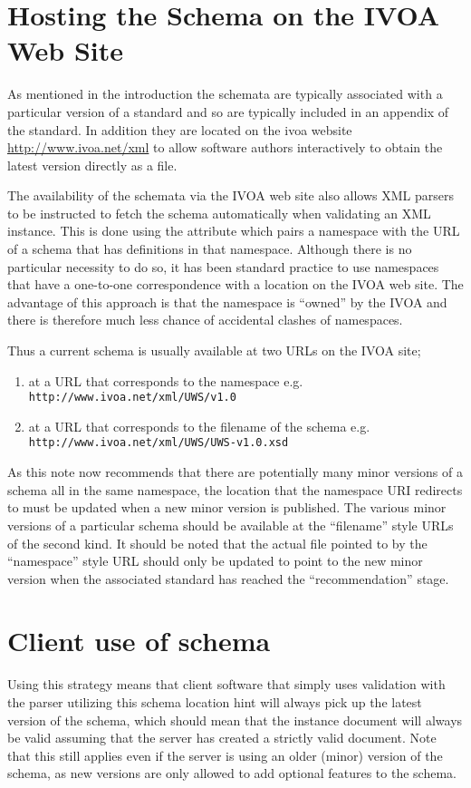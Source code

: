 \documentclass[10pt,a4paper]{ivoa}
\begin{document}
\section{Hosting the Schema on the IVOA Web Site}
As mentioned in the introduction the schemata are typically associated with a
particular version of a standard and so are typically included in an appendix of
the standard. In addition they are located on the ivoa website
\url{http://www.ivoa.net/xml} to allow software authors interactively to
obtain the latest version directly as a file.

The availability of the schemata via the IVOA web site also
allows XML parsers to be instructed to fetch the schema automatically when
validating an XML instance. This is done using the 
attribute which pairs a namespace with the URL of a schema that has definitions
in that namespace. Although there is no particular necessity to do so, it has
been standard practice to use namespaces that have a one-to-one correspondence
with a location on the IVOA web site. The advantage of this approach is that the
namespace is ``owned'' by the IVOA and there is therefore much less chance of
accidental clashes of namespaces.

Thus a current schema is usually available at two URLs on the IVOA site;
\begin{enumerate}
  \item at a URL that corresponds to the namespace \newline e.g.
  \texttt{http://www.ivoa.net/xml/UWS/v1.0}
  \item at a URL that corresponds to the filename of the schema \newline e.g.
  \texttt{http://www.ivoa.net/xml/UWS/UWS-v1.0.xsd}
\end{enumerate}

As this note now recommends that there are potentially many minor versions of a
schema all in the same namespace, the location that the namespace URI
redirects to must be updated when a new minor version is published. The
various minor versions of a particular schema should be available at the
``filename'' style URLs of the second kind. It should be noted that the
actual file pointed to by the ``namespace'' style URL should only be updated to
point to the new minor version when the associated standard has reached the
``recommendation'' stage.

\section{Client use of schema}
Using this strategy means that client software that simply uses validation with
the parser utilizing this schema location hint will always pick up the latest
version of the schema, which should mean that the instance document will always
be valid assuming that the server has created a strictly valid document. Note
that this still applies even if the server is using an older (minor) version of
the schema, as new versions are only allowed to add optional features to the
schema.
\end{document}
